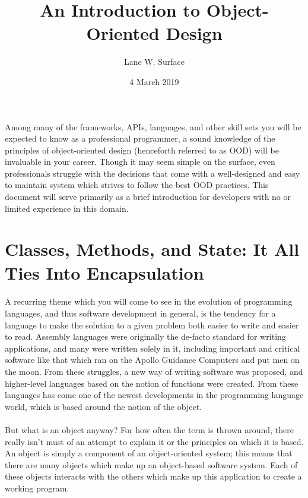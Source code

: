 \documentclass{article}
\title{An Introduction to Object-Oriented Design}
\author{Lane W. Surface}
\date{4 March 2019}
\begin{document}
\maketitle

\newpage
{}
Among many of the frameworks, APIs, languages, and other skill sets you will be expected to know as a professional programmer, a sound knowledge of the principles of object-oriented design (henceforth referred to as OOD) will be invaluable in your career. Though it may seem simple on the surface, even professionals struggle with the decisions that come with a well-designed and easy to maintain system which strives to follow the best OOD practices. This document will serve primarily as a brief introduction for developers with no or limited experience in this domain.
\section{Classes, Methods, and State: It All Ties Into Encapsulation}
\paragraph{}
A recurring theme which you will come to see in the evolution of programming languages, and thus software development in general, is the tendency for a language to make the solution to a given problem both easier to write and easier to read. Assembly languages were originally the de-facto standard for writing applications, and many were written solely in it, including important and critical software like that which ran on the Apollo Guidance Computers and put men on the moon. From these struggles, a new way of writing software was proposed, and higher-level languages based on the notion of functions were created. From these languages has come one of the newest developments in the programming language world, which is based around the notion of the object. 
\paragraph{}
But what is an object anyway? For how often the term is thrown around, there really isn't must of an attempt to explain it or the principles on which it is based. An object is simply a component of an object-oriented system; this means that there are many objects which make up an object-based software system. Each of these objects interacts with the others which make up this application to create a working program.
\end{document}
